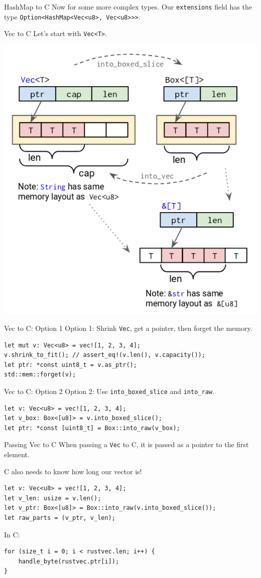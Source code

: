 \documentclass[aspectratio=1610,14pt,t]{beamer}
\begin{document}
\begin{frame}[c]{HashMap to C}
  Now for some more complex types. Our \texttt{extensions} field has
  the type \texttt{Option<HashMap<Vec<u8>, Vec<u8>>>}.
\end{frame}

\begin{frame}[c]{Vec to C}
  Let's start with \texttt{Vec<T>}.

  \includegraphics[width=.5\textwidth]{img/vec.png}
\end{frame}

\begin{frame}[c,fragile]{Vec to C: Option 1}
  Option 1: Shrink \texttt{Vec}, get a pointer, then forget the memory.

  \begin{verbatim}
let mut v: Vec<u8> = vec![1, 2, 3, 4];
v.shrink_to_fit(); // assert_eq!(v.len(), v.capacity());
let ptr: *const uint8_t = v.as_ptr();
std::mem::forget(v);
  \end{verbatim}
\end{frame}

\begin{frame}[c,fragile]{Vec to C: Option 2}
  Option 2: Use \texttt{into\_boxed\_slice} and \texttt{into\_raw}.

  \begin{verbatim}
let v: Vec<u8> = vec![1, 2, 3, 4];
let v_box: Box<[u8]> = v.into_boxed_slice();
let ptr: *const [uint8_t] = Box::into_raw(v_box);
  \end{verbatim}
\end{frame}

\begin{frame}[c,fragile]{Passing Vec to C}
  When passing a \texttt{Vec} to C, it is passed as a pointer to the first
  element.

  C also needs to know how long our vector is!

  \begin{verbatim}
let v: Vec<u8> = vec![1, 2, 3, 4];
let v_len: usize = v.len();
let v_ptr: Box<[u8]> = Box::into_raw(v.into_boxed_slice());
let raw_parts = (v_ptr, v_len);
  \end{verbatim}

  In C:

  \begin{verbatim}
for (size_t i = 0; i < rustvec.len; i++) {
    handle_byte(rustvec.ptr[i]);
}
  \end{verbatim}
\end{frame}
\end{document}
